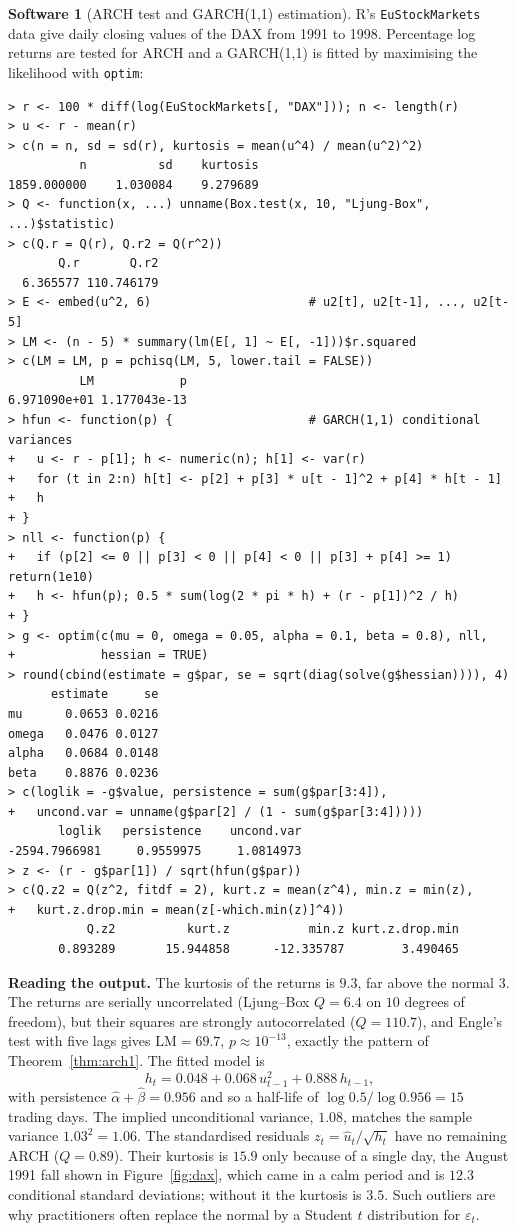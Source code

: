 \documentclass[11pt,a4paper]{article}
\numberwithin{equation}{section}
\theoremstyle{definition}
\newtheorem{software}[thm]{Software}
\begin{document}
\begin{software}[ARCH test and GARCH(1,1) estimation]
\label{sw:arch}
R's \texttt{EuStockMarkets} data give daily closing values of the DAX from 1991 to 1998. Percentage log returns are tested for ARCH and a GARCH(1,1)
is fitted by maximising the likelihood with \texttt{optim}:
{\small\begin{verbatim}
> r <- 100 * diff(log(EuStockMarkets[, "DAX"])); n <- length(r)
> u <- r - mean(r)
> c(n = n, sd = sd(r), kurtosis = mean(u^4) / mean(u^2)^2)
          n          sd    kurtosis 
1859.000000    1.030084    9.279689 
> Q <- function(x, ...) unname(Box.test(x, 10, "Ljung-Box", ...)$statistic)
> c(Q.r = Q(r), Q.r2 = Q(r^2))
       Q.r       Q.r2 
  6.365577 110.746179 
> E <- embed(u^2, 6)                      # u2[t], u2[t-1], ..., u2[t-5]
> LM <- (n - 5) * summary(lm(E[, 1] ~ E[, -1]))$r.squared
> c(LM = LM, p = pchisq(LM, 5, lower.tail = FALSE))
          LM            p 
6.971090e+01 1.177043e-13 
> hfun <- function(p) {                   # GARCH(1,1) conditional variances
+   u <- r - p[1]; h <- numeric(n); h[1] <- var(r)
+   for (t in 2:n) h[t] <- p[2] + p[3] * u[t - 1]^2 + p[4] * h[t - 1]
+   h
+ }
> nll <- function(p) {
+   if (p[2] <= 0 || p[3] < 0 || p[4] < 0 || p[3] + p[4] >= 1) return(1e10)
+   h <- hfun(p); 0.5 * sum(log(2 * pi * h) + (r - p[1])^2 / h)
+ }
> g <- optim(c(mu = 0, omega = 0.05, alpha = 0.1, beta = 0.8), nll,
+            hessian = TRUE)
> round(cbind(estimate = g$par, se = sqrt(diag(solve(g$hessian)))), 4)
      estimate     se
mu      0.0653 0.0216
omega   0.0476 0.0127
alpha   0.0684 0.0148
beta    0.8876 0.0236
> c(loglik = -g$value, persistence = sum(g$par[3:4]),
+   uncond.var = unname(g$par[2] / (1 - sum(g$par[3:4]))))
       loglik   persistence    uncond.var 
-2594.7966981     0.9559975     1.0814973 
> z <- (r - g$par[1]) / sqrt(hfun(g$par))
> c(Q.z2 = Q(z^2, fitdf = 2), kurt.z = mean(z^4), min.z = min(z),
+   kurt.z.drop.min = mean(z[-which.min(z)]^4))
           Q.z2          kurt.z           min.z kurt.z.drop.min 
       0.893289       15.944858      -12.335787        3.490465 
\end{verbatim}}
\textbf{Reading the output.} The kurtosis of the returns is $9.3$, far above the normal $3$. The returns are serially uncorrelated (Ljung--Box $Q = 6.4$ on $10$
degrees of freedom), but their squares are strongly autocorrelated ($Q = 110.7$), and Engle's test with five lags gives $\text{LM} = 69.7$, $p \approx 10^{-13}$, exactly the
pattern of Theorem~\ref{thm:arch1}. The fitted model is
\[
h_t = 0.048 + 0.068\,u_{t-1}^2 + 0.888\,h_{t-1},
\]
with persistence $\hat\alpha + \hat\beta = 0.956$ and so a half-life of $\log 0.5/\log 0.956 = 15$ trading days. The implied unconditional variance, $1.08$, matches the sample
variance $1.03^2 = 1.06$. The standardised residuals $z_t = \hat u_t/\sqrt{h_t}$ have no remaining ARCH ($Q = 0.89$). Their kurtosis is $15.9$ only because of a single day,
the August 1991 fall shown in Figure~\ref{fig:dax}, which came in a calm period and is $12.3$ conditional standard deviations; without it the kurtosis is
$3.5$. Such outliers are why practitioners often replace the normal by a Student $t$ distribution for $\varepsilon_t$.


\end{software}
\end{document}
